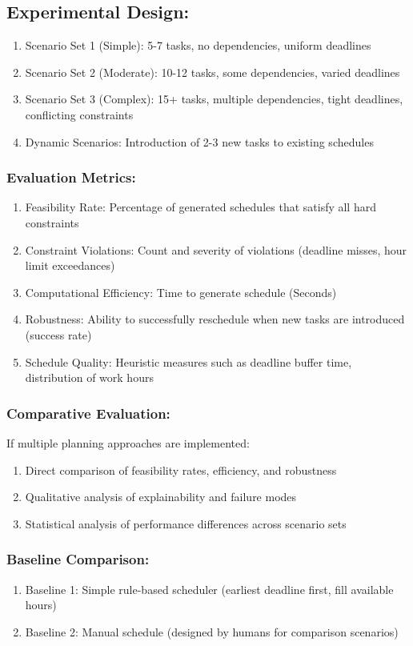 \documentclass[12pt]{article}
\begin{document}
\subsection{Experimental Design:}
\begin{enumerate}
    \item Scenario Set 1 (Simple): 5-7 tasks, no dependencies, uniform deadlines
    \item Scenario Set 2 (Moderate): 10-12 tasks, some dependencies, varied deadlines
    \item Scenario Set 3 (Complex): 15+ tasks, multiple dependencies, tight deadlines, conflicting constraints
    \item Dynamic Scenarios: Introduction of 2-3 new tasks to existing schedules
\end{enumerate}
\subsubsection{Evaluation Metrics:}
\begin{enumerate}
    \item Feasibility Rate: Percentage of generated schedules that satisfy all hard constraints
    \item Constraint Violations: Count and severity of violations (deadline misses, hour limit exceedances)
    \item Computational Efficiency: Time to generate schedule (Seconds)
    \item Robustness: Ability to successfully reschedule when new tasks are introduced (success rate)
    \item Schedule Quality: Heuristic measures such as deadline buffer time, distribution of work hours
\end{enumerate}
\subsubsection{Comparative Evaluation:}
If multiple planning approaches are implemented:
\begin{enumerate}
    \item Direct comparison of feasibility rates, efficiency, and robustness
    \item Qualitative analysis of explainability and failure modes
    \item Statistical analysis of performance differences across scenario sets
\end{enumerate}
\subsubsection{Baseline Comparison:}
\begin{enumerate}
    \item Baseline 1: Simple rule-based scheduler (earliest deadline first, fill available hours)
    \item Baseline 2: Manual schedule (designed by humans for comparison scenarios)
\end{enumerate}
\end{document}
